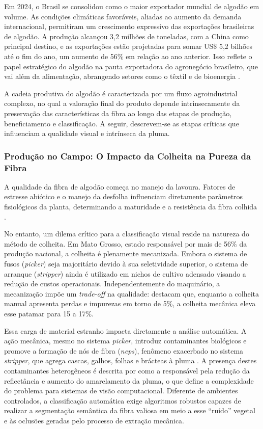     Em 2024, o Brasil se consolidou como o maior exportador mundial de algodão em volume. As condições climáticas favoráveis, aliadas ao aumento da demanda internacional, permitiram um crescimento expressivo das exportações brasileiras de algodão. A produção alcançou 3,2 milhões de toneladas, com a China como principal destino, e as exportações estão projetadas para somar US\$ 5,2 bilhões até o fim do ano, um aumento de 56\% em relação ao ano anterior. Isso reflete o papel estratégico do algodão na pauta exportadora do agronegócio brasileiro, que vai além da alimentação, abrangendo setores como o têxtil e de bioenergia \cite{cardoso2024perspectivas}.

    A cadeia produtiva do algodão é caracterizada por um fluxo agroindustrial complexo, no qual a valoração final do produto depende intrinsecamente da preservação das características da fibra ao longo das etapas de produção, beneficiamento e classificação. A seguir, descrevem-se as etapas críticas que influenciam a qualidade visual e intrínseca da pluma.

    \subsubsection{Produção no Campo: O Impacto da Colheita na Pureza da Fibra}

        A qualidade da fibra de algodão começa no manejo da lavoura. Fatores de estresse abiótico e o manejo da desfolha influenciam diretamente parâmetros fisiológicos da planta, determinando a maturidade e a resistência da fibra colhida \cite{sezener2021cotton}.

        No entanto, um dilema crítico para a classificação visual reside na natureza do método de colheita. Em Mato Grosso, estado responsável por mais de 56\% da produção nacional, a colheita é plenamente mecanizada. Embora o sistema de fusos (\textit{picker}) seja majoritário devido à sua seletividade superior, o sistema de arranque (\textit{stripper}) ainda é utilizado em nichos de cultivo adensado visando a redução de custos operacionais. Independentemente do maquinário, a mecanização impõe um \textit{trade-off} na qualidade:  destacam que, enquanto a colheita manual apresenta perdas e impurezas em torno de 5\%, a colheita mecânica eleva esse patamar para 15 a 17\%.

        Essa carga de material estranho impacta diretamente a análise automática. A ação mecânica, mesmo no sistema \textit{picker}, introduz contaminantes biológicos e promove a formação de nós de fibra (\textit{neps}), fenômeno exacerbado no sistema \textit{stripper}, que agrega cascas, galhos, folhas e brácteas à pluma \cite{kazama2016influencia, silva2007colheita}. A presença destes contaminantes heterogêneos é descrita por  como a responsável pela redução da reflectância e aumento do amarelamento da pluma, o que define a complexidade do problema para sistemas de visão computacional. Diferente de ambientes controlados, a classificação automática exige algoritmos robustos capazes de realizar a segmentação semântica da fibra valiosa em meio a esse ``ruído'' vegetal e às oclusões geradas pelo processo de extração mecânica.

